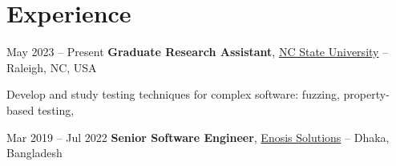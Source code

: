 \section{Experience}

    \begin{twocolentry}{
        May 2023 – Present
    }
        \textbf{Graduate Research Assistant}, \href{https://ncsu.software/}{NC State University} -- Raleigh, NC, USA\end{twocolentry}

    \headgap
    \begin{onecolentry}
        \begin{highlights}
            \item Develop and study testing techniques for complex software: fuzzing, property-based testing, 
        \end{highlights}
    \end{onecolentry}

    \entrygap

    \ifdefined\academictrue\else
        
        \entrygap
    \fi

    \begin{twocolentry}{
        Mar 2019 – Jul 2022
    }
        \textbf{Senior Software Engineer}, \href{https://www.enosisbd.com/}{Enosis Solutions} -- Dhaka, Bangladesh\end{twocolentry}

